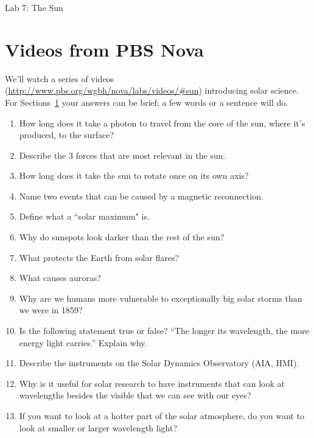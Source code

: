 \documentclass[12pt]{article}%
\newcommand{\labnumber}{7}  %
\begin{document}
\thispagestyle{empty}

\begin{center}
\Huge Lab \labnumber: The Sun
\end{center}

\section{Videos from PBS Nova}\label{sec:vid}
We'll watch a series of videos
(\url{http://www.pbs.org/wgbh/nova/labs/videos/\#sun}) introducing solar
science. For Sections~\ref{sec:vid} your answers can be brief; a few words or a sentence will do.
\begin{enumerate}
\item How long does it take a photon to travel from the core of the sun, where it's produced, to the surface?
\item Describe the 3 forces that are most relevant in the sun.
\item How long does it take the sun to rotate once on its own axis?

\item Name two events that can be caused by a magnetic reconnection.
\item Define what a ``solar maximum" is.
\item Why do sunspots look darker than the rest of the sun?
\item What protects the Earth from solar flares?
\item What causes auroras?
\item Why are we humans more vulnerable to exceptionally big solar storms than we were in 1859?
\item Is the following statement true or false? ``The longer its wavelength, the more energy light carries.'' Explain why.
\item Describe the instruments on the Solar Dynamics Observatory (AIA, HMI).
\item Why is it useful for solar research to have instruments that can look at wavelengths besides the visible that we can see with our eyes?
\item If you want to look at a hotter part of the solar atmosphere, do you want to look at smaller or larger wavelength light?
\end{enumerate}
\end{document}
